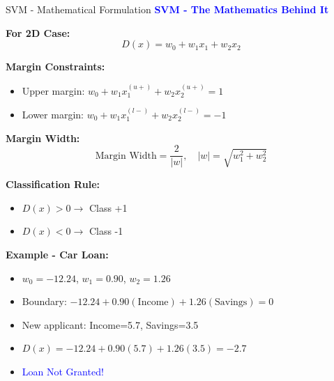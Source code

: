 \documentclass[8pt]{beamer}
\begin{document}
	\begin{frame}{SVM - Mathematical Formulation}
		\fontsize{6.5}{7.5}\selectfont
		\textcolor{blue}{\textbf{SVM - The Mathematics Behind It}}
		
		\textbf{For 2D Case:}
		\[
		D(x) = w_0 + w_1 x_1 + w_2 x_2
		\]
		
		\textbf{Margin Constraints:}
		\begin{itemize}
			\item Upper margin: $w_0 + w_1 x_1^{(u+)} + w_2 x_2^{(u+)} = 1$
			\item Lower margin: $w_0 + w_1 x_1^{(l-)} + w_2 x_2^{(l-)} = -1$
		\end{itemize}
		
		\textbf{Margin Width:}
		\[
		\text{Margin Width} = \frac{2}{|w|}, \quad |w| = \sqrt{w_1^2 + w_2^2}
		\]
		
		\textbf{Classification Rule:}
		\begin{itemize}
			\item $D(x) > 0 \rightarrow$ Class +1
			\item $D(x) < 0 \rightarrow$ Class -1
		\end{itemize}
		
		\textbf{Example - Car Loan:}
		\begin{itemize}
			\item $w_0 = -12.24$, $w_1 = 0.90$, $w_2 = 1.26$
			\item Boundary: $-12.24 + 0.90(\text{Income}) + 1.26(\text{Savings}) = 0$
			\item New applicant: Income=5.7, Savings=3.5
			\item $D(x) = -12.24 + 0.90(5.7) + 1.26(3.5) = -2.7$
			\item \textcolor{blue}{Loan Not Granted!}
		\end{itemize}
	\end{frame}
	
\end{document}
